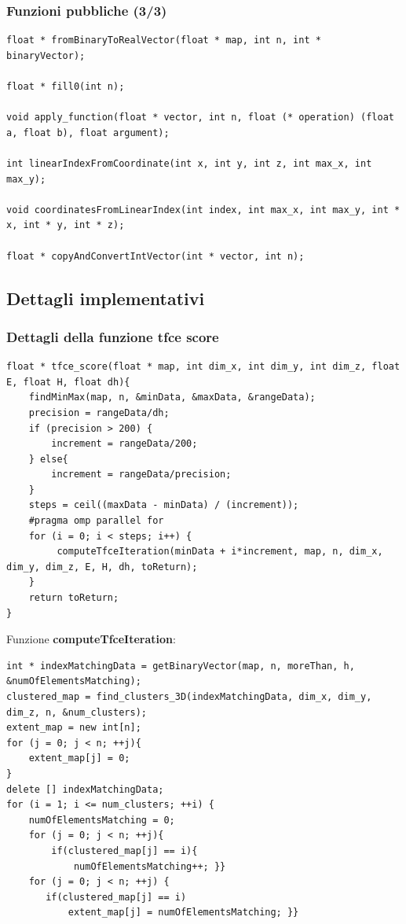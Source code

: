 \documentclass{beamer}
\begin{document}
\begin{frame}[fragile]
\frametitle{Funzioni pubbliche (3/3)}
\begin{center}
\begin{lstlisting}
float * fromBinaryToRealVector(float * map, int n, int * binaryVector);

float * fill0(int n);

void apply_function(float * vector, int n, float (* operation) (float a, float b), float argument);

int linearIndexFromCoordinate(int x, int y, int z, int max_x, int max_y);

void coordinatesFromLinearIndex(int index, int max_x, int max_y, int * x, int * y, int * z);

float * copyAndConvertIntVector(int * vector, int n);
\end{lstlisting}
\end{center}
\end{frame}

\subsection{Dettagli implementativi}
\begin{frame}[fragile]
\frametitle{Dettagli della funzione tfce score}
\begin{center}
\begin{lstlisting}
float * tfce_score(float * map, int dim_x, int dim_y, int dim_z, float E, float H, float dh){
	findMinMax(map, n, &minData, &maxData, &rangeData);
	precision = rangeData/dh;
	if (precision > 200) {
		increment = rangeData/200;
	} else{
		increment = rangeData/precision;	
	}
	steps = ceil((maxData - minData) / (increment));
	#pragma omp parallel for
	for (i = 0; i < steps; i++) {
		 computeTfceIteration(minData + i*increment, map, n, dim_x, dim_y, dim_z, E, H, dh, toReturn);
	}	
	return toReturn;
}
\end{lstlisting}
\end{center}
\end{frame}

\begin{frame}[fragile]
Funzione \textbf{computeTfceIteration}:
\begin{center}
\begin{lstlisting}
int * indexMatchingData = getBinaryVector(map, n, moreThan, h, &numOfElementsMatching);
clustered_map = find_clusters_3D(indexMatchingData, dim_x, dim_y, dim_z, n, &num_clusters);
extent_map = new int[n];
for (j = 0; j < n; ++j){
    extent_map[j] = 0;
}
delete [] indexMatchingData;
for (i = 1; i <= num_clusters; ++i) {
    numOfElementsMatching = 0;	
    for (j = 0; j < n; ++j){
        if(clustered_map[j] == i){
            numOfElementsMatching++; }}
    for (j = 0; j < n; ++j) {
       if(clustered_map[j] == i)
           extent_map[j] = numOfElementsMatching; }}
\end{lstlisting}
\end{center}
\end{frame}
\end{document}
